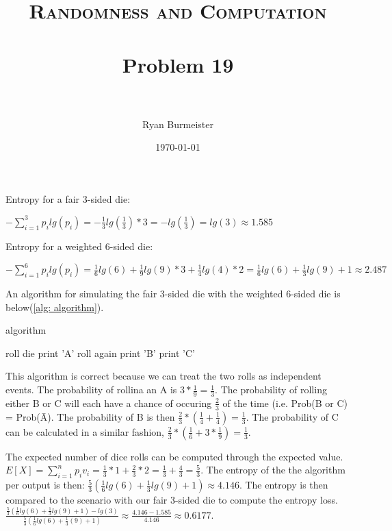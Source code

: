 \documentclass[fontsize=12pt]{article}
\title{ 
  \normalfont \normalsize 
  \textsc{Randomness and Computation} \\ [25pt] %
  \horrule{0.5pt} \\[0.4cm] %
  \huge Problem 19 \\ %
  \horrule{2pt} \\[0.5cm] %
}
\author{Ryan Burmeister} %
\date{\normalsize\today} %
\numberwithin{equation}{section} %
\numberwithin{figure}{section} %
\numberwithin{table}{section} %
\begin{document}
\maketitle %
Entropy for a fair 3-sided die: \begin{center} $-\sum_{i=1}^{3}p_ilg(p_i) =
-\frac{1}{3}lg(\frac{1}{3})*3 = -lg(\frac{1}{3}) = lg(3) \approx 1.585$
\end{center}
Entropy for a weighted 6-sided die: \begin{center}
$-\sum_{i=1}^{6}p_ilg(p_i) =
\frac{1}{6}lg(6)+\frac{1}{9}lg(9)*3+\frac{1}{4}lg(4)*2 =
\frac{1}{6}lg(6)+\frac{1}{3}lg(9)+1\approx2.487$ \end{center} 

An algorithm for simulating the fair 3-sided die with the weighted
6-sided die is below(\ref{alg: algorithm}).

\begin{algorithm}
  \caption{algorithm}\label{alg: algorithm}
  \begin{algorithmic}[1]
      \State roll die
        \State print 'A'
      \Else
        \State roll again
          \State print 'B'
        \Else
          \State print 'C'
        \EndIf
      \EndIf
    \EndWhile
 \end{algorithmic} 
\end{algorithm}
    
This algorithm is correct because we can treat the two rolls as independent
events.  The probability of rollina an A is $3*\frac{1}{9} = \frac{1}{3}$.
The probability of rolling either B or C will each have a chance of
occuring $\frac{2}{3}$ of the time (i.e. Prob(B or C) = Prob({\=A}).  The
probability of B is then $\frac{2}{3}*(\frac{1}{4}+\frac{1}{4}) =
\frac{1}{3}$.  The probability of C can be calculated in a similar fashion,
$\frac{2}{3} * (\frac{1}{6} + 3*\frac{1}{9}) = \frac{1}{3}$.

The expected number of dice rolls can be computed through the expected value.
$E[X] = \sum_{i=1}^{n}p_iv_i = \frac{1}{3}*1 + \frac{2}{3}*2 =
\frac{1}{3}+\frac{4}{3} = \frac{5}{3}$.  The entropy of the the algorithm per
output is then: $\frac{5}{3}(\frac{1}{6}lg(6)+\frac{1}{3}lg(9)+1) \approx
4.146$.  The entropy is then compared to the scenario with our fair 3-sided die
to compute the entropy loss.
$\frac{\frac{5}{3}(\frac{1}{6}lg(6)+\frac{1}{3}lg(9)+1)-lg(3)}{\frac{5}{3}(\frac{1}{6}lg(6)+\frac{1}{3}(9)+1)}
\approx \frac{4.146-1.585}{4.146} \approx 0.6177$.
\end{document}
